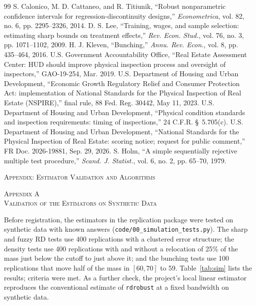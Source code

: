 \documentclass[10pt,twocolumn,letterpaper]{article}
\newcommand{\appsection}[2]{\par\vspace{2.2ex}\begin{center}\textsc{Appendix #1}\\\textsc{#2}\end{center}\vspace{0.6ex}}
\begin{document}
\begin{thebibliography}{99}
 S. Calonico, M. D. Cattaneo, and R. Titiunik, ``Robust nonparametric confidence intervals for regression-discontinuity designs,'' \emph{Econometrica}, vol. 82, no. 6, pp. 2295--2326, 2014.
 D. S. Lee, ``Training, wages, and sample selection: estimating sharp bounds on treatment effects,'' \emph{Rev. Econ. Stud.}, vol. 76, no. 3, pp. 1071--1102, 2009.
 H. J. Kleven, ``Bunching,'' \emph{Annu. Rev. Econ.}, vol. 8, pp. 435--464, 2016.
 U.S. Government Accountability Office, ``Real Estate Assessment Center: HUD should improve physical inspection process and oversight of inspectors,'' GAO-19-254, Mar. 2019.
 U.S. Department of Housing and Urban Development, ``Economic Growth Regulatory Relief and Consumer Protection Act: implementation of National Standards for the Physical Inspection of Real Estate (NSPIRE),'' final rule, 88 Fed. Reg. 30442, May 11, 2023.
 U.S. Department of Housing and Urban Development, ``Physical condition standards and inspection requirements: timing of inspections,'' 24 C.F.R. \S~5.705(c).
 U.S. Department of Housing and Urban Development, ``National Standards for the Physical Inspection of Real Estate: scoring notice; request for public comment,'' FR Doc. 2026-19881, Sep. 29, 2026.
 S. Holm, ``A simple sequentially rejective multiple test procedure,'' \emph{Scand. J. Statist.}, vol. 6, no. 2, pp. 65--70, 1979.
\end{thebibliography}

\clearpage
\onecolumn
\begin{center}\textsc{Appendix: Estimator Validation and Algorithms}\end{center}

\appsection{A}{Validation of the Estimators on Synthetic Data}
Before registration, the estimators in the replication package were tested on synthetic data with known answers (\texttt{code/00\_simulation\_tests.py}). The sharp and fuzzy RD tests use 400 replications with a clustered error structure; the density tests use 400 replications with and without a relocation of 25\% of the mass just below the cutoff to just above it; and the bunching tests use 100 replications that move half of the mass in $[60,70]$ to 59. Table~\ref{tab:sim} lists the results; \simAllPass{} criteria were met. As a further check, the project's local linear estimator reproduces the conventional estimate of \texttt{rdrobust} at a fixed bandwidth on synthetic data.
\end{document}
